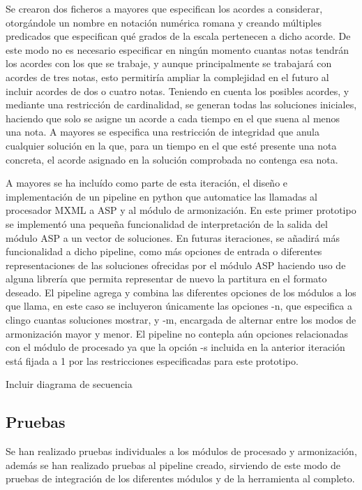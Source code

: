 Se crearon dos ficheros a mayores que especifican los acordes a considerar, otorgándole un nombre en notación numérica romana y creando múltiples predicados que especifican qué grados de la escala pertenecen a dicho acorde. De este modo no es necesario especificar en ningún momento cuantas notas tendrán los acordes con los que se trabaje, y aunque principalmente se trabajará con acordes de tres notas, esto permitiría ampliar la complejidad en el futuro al incluir acordes de dos o cuatro notas. Teniendo en cuenta los posibles acordes, y mediante una restricción de cardinalidad, se generan todas las soluciones iniciales, haciendo que solo se asigne un acorde a cada tiempo en el que suena al menos una nota. A mayores se especifica una restricción de integridad que anula cualquier solución en la que, para un tiempo en el que esté presente una nota concreta, el acorde asignado en la solución comprobada no contenga esa nota. 

A mayores se ha incluído como parte de esta iteración, el diseño e implementación de un pipeline en python que automatice las llamadas al procesador MXML a ASP y al módulo de armonización. En este primer prototipo se implementó una pequeña funcionalidad de interpretación de la salida del módulo ASP a un vector de soluciones. En futuras iteraciones, se añadirá más funcionalidad a dicho pipeline, como más opciones de entrada o diferentes representaciones de las soluciones ofrecidas por el módulo ASP haciendo uso de alguna librería que permita representar de nuevo la partitura en el formato deseado. El pipeline agrega y combina las diferentes opciones de los módulos a los que llama, en este caso se incluyeron únicamente las opciones -n, que especifica a clingo cuantas soluciones mostrar, y -m, encargada de alternar entre los modos de armonización mayor y menor. El pipeline no contepla aún opciones relacionadas con el módulo de procesado ya que la opción -s incluida en la anterior iteración está fijada a 1 por las restricciones especificadas para este prototipo. 

Incluir diagrama de secuencia \\

\subsection{Pruebas}
Se han realizado pruebas individuales a los módulos de procesado y armonización, además se han realizado pruebas al pipeline creado, sirviendo de este modo de pruebas de integración de los diferentes módulos y de la herramienta al completo.

